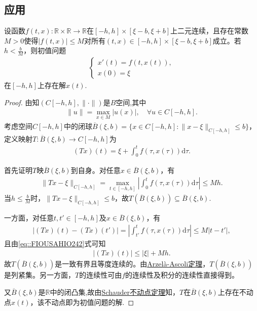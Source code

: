 \documentclass[../../main.tex]{subfiles}%
\begin{document}
\subsection{应用}

\begin{theorem}[Caratheodory定理]\label{theorem:Caratheodory定理}
设函数$f(t,x):\mathbb{R}\times\mathbb{R}\to\mathbb{R}$在$[-h,h]\times[\xi-b,\xi+b]$上二元连续，且存在常数$M>0$使得$|f(t,x)|\leqslant M$对所有$(t,x)\in[-h,h]\times[\xi-b,\xi+b]$成立。若$h<\frac{b}{M}$，则初值问题
\begin{align*}
\begin{cases}
x'(t)=f(t,x(t)), \\
x(0)=\xi
\end{cases}
\end{align*}
在$[-h,h]$上存在解$x(t)$.
\end{theorem}
\begin{proof}

由知$(C[-h,h],\|\cdot\|)$是$B$空间,其中
\begin{align*}
\|u\|=\max_{x\in M}|u(x)|,\quad \forall u\in C[-h,h].
\end{align*}
考虑空间$C[-h,h]$中的闭球$\overline{B}(\xi,b)=\{x\in C[-h,h]:\|x-\xi\|_{C[-h,h]}\leqslant b\}$，定义映射$T:\overline{B}(\xi,b)\to C[-h,h]$为
\begin{align*}
(Tx)(t)=\xi+\int_{0}^{t}f(\tau,x(\tau))\mathrm{d}\tau.
\end{align*}

首先证明$T$映$\overline{B}(\xi,b)$到自身。对任意$x\in\overline{B}(\xi,b)$，有
\begin{align}\label{eq::FIOUSAHIO242}
\|Tx-\xi\|_{C[-h,h]}=\max_{t\in[-h,h]}\left|\int_{0}^{t}f(\tau,x(\tau))\mathrm{d}\tau\right|\leqslant Mh.
\end{align}
当$h\leqslant\frac{b}{M}$时，$\|Tx-\xi\|_{C[-h,h]}\leqslant b$，故$T(\overline{B}(\xi,b))\subseteq\overline{B}(\xi,b)$.

一方面，对任意$t,t'\in[-h,h]$及$x\in\overline{B}(\xi,b)$，有
\begin{align*}
|(Tx)(t)-(Tx)(t')|=\left|\int_{t'}^{t}f(\tau,x(\tau))\mathrm{d}\tau\right|\leqslant M|t-t'|,
\end{align*}
且由\eqref{eq::FIOUSAHIO242}式可知
\begin{align*}
|(Tx)(t)|\leqslant|\xi|+Mh.
\end{align*}
故$T(\overline{B}(\xi,b))$是一致有界且等度连续的。由\hyperref[theorem:泛函分析--Arzelà-Ascoli定理]{Arzelà-Ascoli定理}，$T(\overline{B}(\xi,b))$是列紧集。另一方面，$T$的连续性可由$f$的连续性及积分的连续性直接得到。

又$\overline{B}(\xi,b)$是$\mathbb{R}$中的闭凸集,故由\hyperref[theorem:泛函分析---Schauder不动点定理]{Schauder不动点定理}知，$T$在$\overline{B}(\xi,b)$上存在不动点$x(t)$，该不动点即为初值问题的解.

\end{proof}
\end{document}
